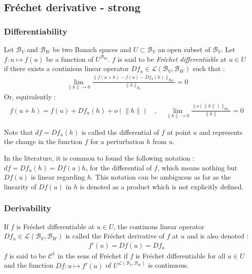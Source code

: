 \subsection{Fréchet derivative - strong}
\subsubsection{Differentiability}
Let $\mathcal{B}_V$ and $\mathcal{B}_W$ be two Banach spaces and $U \subset \mathcal{B}_V$ an open subset of $\mathcal{B}_V$.
Let $f : u \longmapsto f(u)$ be a function of  $U^{\mathcal{B}_W}$.
$f$ is said to be \emph{Fréchet differentiable} at $u\in U$ if there exists a continious linear operator $Df_{u} \in 
\mathcal{L}(\mathcal{B}_V,{\mathcal{B}_W})$ such that :
\begin{align}
\lim_{\|h\| \to 0} \frac{\|f(u+h) - f(u)- Df_{u}(h)\|_{\mathcal{B}_W}}{\|h\|_{\mathcal{B}_V}} = 0
\end{align}
Or, equivalently :
\begin{align}
	f(u+h) = f(u) + Df_{u}(h) + o(\|h\|) \quad , \quad 
	\lim_{\|h\| \to 0} \frac{\|o(\|h\|)\|_{\mathcal{B}_W}}{\|h\|} = 0
\end{align}

Note that $df = Df_{u}(h)$ is called the differential of $f$ at point $u$ and represents the change in the function $f$ for a perturbation $h$ from $u$.

In the literature, it is common to found the following notation : $df = Df_u(h) = Df(u)h$, for the differential of $f$, which means nothing but $Df(u)$ is linear regarding $h$. This notation can be ambiguous as far as the linearity of $Df(u)$ in $h$ is denoted as a product which is not explicitly defined.

\subsubsection{Derivability}

If $f$ is Fréchet differentiable at $u \in U$, the continous linear operator $Df_{u} \in 
\mathcal{L}(\mathcal{B}_V,{\mathcal{B}_W})$ is called the Fréchet derivative of $f$ at $u$ and is also denoted :
\begin{align}
	f'(u) = Df(u) = Df_{u}
\end{align}
$f$ is said to be $\mathcal{C}^1$ in the sens of Fréchet if $f$ is Fréchet differentiable for all $u \in U$ and the function $Df : u \longmapsto f'(u)$ of $U^{\mathcal{L}(\mathcal{B}_V,{\mathcal{B}_W})}$ is continuous.
 
